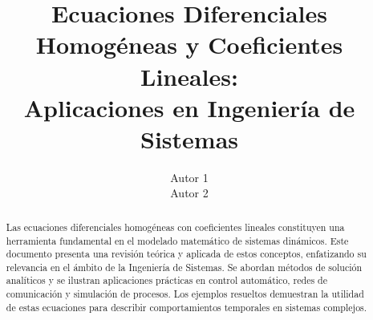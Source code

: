 

\title{Ecuaciones Diferenciales Homogéneas y Coeficientes Lineales:\\Aplicaciones en Ingeniería de Sistemas}

\author{Autor 1\\Autor 2}
\duedate{\today}

\maketitle
\begin{abstract}
Las ecuaciones diferenciales homogéneas con coeficientes lineales constituyen una herramienta fundamental en el modelado matemático de sistemas dinámicos. Este documento presenta una revisión teórica y aplicada de estos conceptos, enfatizando su relevancia en el ámbito de la Ingeniería de Sistemas. Se abordan métodos de solución analíticos y se ilustran aplicaciones prácticas en control automático, redes de comunicación y simulación de procesos. Los ejemplos resueltos demuestran la utilidad de estas ecuaciones para describir comportamientos temporales en sistemas complejos.
\end{abstract}
\thispagestyle{titlepage}   %